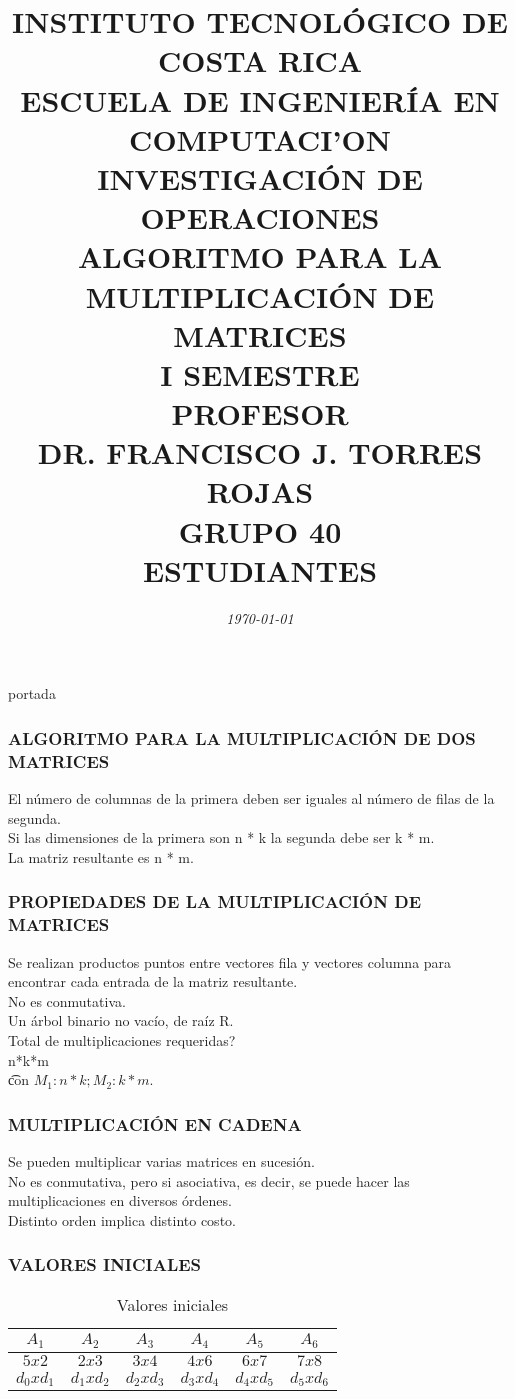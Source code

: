 \documentclass[10]{beamer}
\title{{\color{WHITE} \large \textbf{INSTITUTO TECNOL\'OGICO DE COSTA RICA}} \\ \vspace{0.02cm} 
{\color{WHITE} \large \textbf{ESCUELA DE INGENIER\'IA EN COMPUTACI'ON }} \\ \vspace{0.02cm} 
{\color{WHITE} \large \textbf{INVESTIGACI\'ON DE OPERACIONES  }} \\ \vspace{0.02cm} 
{\color{WHITE} \large \textbf{ALGORITMO PARA LA \\ MULTIPLICACI\'ON DE MATRICES  }} \\ \vspace{0.02cm} 
{\color{WHITE} \large \textbf{I SEMESTRE  }}\\ \vspace{0.02cm}
{\color{WHITE} \large \textbf{PROFESOR}} \\ \vspace{0.02cm}
{\color{WHITE} \large DR. FRANCISCO J. TORRES ROJAS  } \\ \vspace{0.02cm}
{\color{WHITE} \large \textbf{GRUPO 40}} \\ \vspace{0.01cm}
{\color{WHITE} \large \textbf{ESTUDIANTES} }}
\date{\em \color{WHITE} \today}
\begin{document}
\begin{frame}
\color{white}
\titlepage portada
\end{frame} 
\begin{frame}
\color{white}
\frametitle{ALGORITMO PARA LA MULTIPLICACI\'ON DE DOS MATRICES}
El n\'umero de columnas de la primera deben ser iguales al n\'umero de filas de la segunda.
\\ Si las dimensiones de la primera son n * k la segunda debe ser k * m.
\\ La matriz resultante es n * m.
\end{frame} 
\begin{frame}
\color{white}
\frametitle{PROPIEDADES DE LA MULTIPLICACI\'ON DE MATRICES}
Se realizan productos puntos entre vectores fila y vectores columna para encontrar cada entrada de la matriz resultante.
\\ No es conmutativa.
\\Un \'arbol binario no vac\'io, de ra\'iz R.
\\ Total de multiplicaciones requeridas? \\ n*k*m  \\ \t con $M_1:n*k; M_2: k*m$.
\end{frame} 
\begin{frame}
\color{white}
\frametitle{MULTIPLICACI\'ON EN CADENA}
Se pueden multiplicar varias matrices en sucesi\'on.
\\ No es conmutativa, pero si asociativa, es decir, se puede hacer las multiplicaciones en diversos \'ordenes.
\\ Distinto orden implica distinto costo.
\end{frame} 
\begin{frame}\frametitle{VALORES INICIALES}
 \color{white}
\begin{table}
 \begin{tabular}{ c | c  | c  | c  | c  | c }
 \\  $A_1$ & $A_2$   & $A_3$   & $A_4$   & $A_5$   & $A_6$  \\ 
 \hline \hline 
 $5x2$& $2x3$& $3x4$& $4x6$& $6x7$& $7x8$ \\ 
  $d_0xd_1$& $d_1xd_2$& $d_2xd_3$& $d_3xd_4$& $d_4xd_5$& $d_5xd_6$ 
 \end{tabular}
 \color{white}
\caption{Valores iniciales}
 \end{table}
 \end{frame} 
\end{document}
